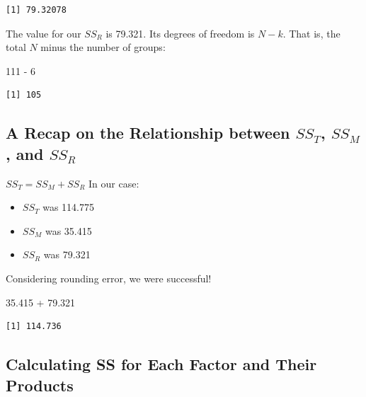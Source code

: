 \documentclass[
  11pt,
]{book}
\newenvironment{Shaded}{\begin{snugshade}}{\end{snugshade}}
\newcommand{\DecValTok}[1]{\textcolor[rgb]{0.00,0.00,0.81}{#1}}
\newcommand{\FloatTok}[1]{\textcolor[rgb]{0.00,0.00,0.81}{#1}}
\newcommand{\SpecialCharTok}[1]{\textcolor[rgb]{0.00,0.00,0.00}{#1}}
\providecommand{\tightlist}{%
  \setlength{\itemsep}{0pt}\setlength{\parskip}{0pt}}
\begin{document}
\begin{verbatim}
[1] 79.32078
\end{verbatim}

The value for our \(SS_R\) is 79.321. Its degrees of freedom is \(N - k\). That is, the total \(N\) minus the number of groups:

\begin{Shaded}
\begin{Highlighting}[]
\DecValTok{111} \SpecialCharTok{{-}} \DecValTok{6}
\end{Highlighting}
\end{Shaded}

\begin{verbatim}
[1] 105
\end{verbatim}

\hypertarget{a-recap-on-the-relationship-between-ss_t-ss_m-and-ss_r}{%
\subsection{\texorpdfstring{A Recap on the Relationship between \(SS_T\), \(SS_M\), and \(SS_R\)}{A Recap on the Relationship between SS\_T, SS\_M, and SS\_R}}\label{a-recap-on-the-relationship-between-ss_t-ss_m-and-ss_r}}

\(SS_T = SS_M + SS_R\)
In our case:

\begin{itemize}
\tightlist
\item
  \(SS_T\) was 114.775
\item
  \(SS_M\) was 35.415
\item
  \(SS_R\) was 79.321
\end{itemize}

Considering rounding error, we were successful!

\begin{Shaded}
\begin{Highlighting}[]
\FloatTok{35.415} \SpecialCharTok{+} \FloatTok{79.321}
\end{Highlighting}
\end{Shaded}

\begin{verbatim}
[1] 114.736
\end{verbatim}

\hypertarget{calculating-ss-for-each-factor-and-their-products}{%
\subsection{Calculating SS for Each Factor and Their Products}\label{calculating-ss-for-each-factor-and-their-products}}
\end{document}
